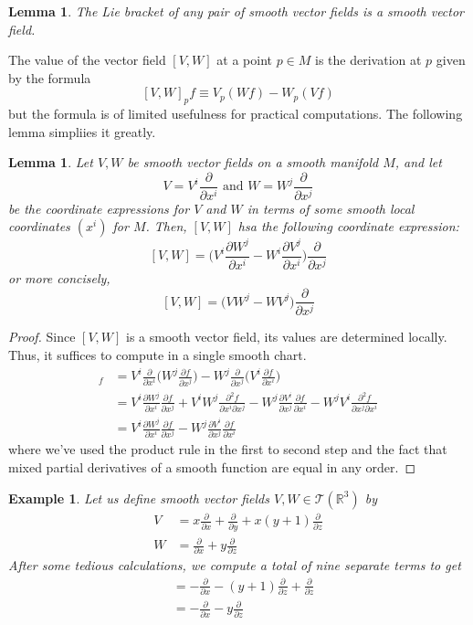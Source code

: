 \documentclass{article}
\newtheorem{lemma}[theorem]{Lemma}
\newtheorem{example}{Example}[section]
\theoremstyle{remark}
\theoremstyle{definition}
\begin{document}
\begin{lemma}
The Lie bracket of any pair of smooth vector fields is a smooth vector field.
\end{lemma}

The value of the vector field $[V, W]$ at a point $p \in M$ is the derivation at $p$ given by the formula
\[[V, W]_p f \equiv V_p (W f) - W_p (V f)\]
but the formula is of limited usefulness for practical computations. The following lemma simpliies it greatly. 

\begin{lemma}
Let $V, W$ be smooth vector fields on a smooth manifold $M$, and let
\[V = V^i \frac{\partial}{\partial x^i} \text{ and } W = W^j \frac{\partial}{\partial x^j}\]
be the coordinate expressions for $V$ and $W$ in terms of some smooth local coordinates $(x^i)$ for $M$. Then, $[V, W]$ hsa the following coordinate expression: 
\[[V, W] = \bigg( V^i \frac{\partial W^j}{\partial x^i} - W^i \frac{\partial V^j}{\partial x^i}\bigg) \frac{\partial}{\partial x^j}\]
or more concisely, 
\[[V, W] = \big(V W^j - W V^j \big) \frac{\partial}{\partial x^j}\]
\end{lemma}
\begin{proof}
Since $[V, W]$ is a smooth vector field, its values are determined locally. Thus, it suffices to compute in a single smooth chart. 
\begin{align*}
    [V,W]_f & = V^i \frac{\partial}{\partial x^i} \bigg( W^j \frac{\partial f}{\partial x^j} \bigg) - W^j \frac{\partial}{\partial x^j} \bigg( V^i \frac{\partial f}{\partial x^i} \bigg) \\
    & = V^i \frac{\partial W^j}{\partial x^i} \frac{\partial f}{\partial x^j} + V^i W^j \frac{\partial^2 f}{\partial x^i \partial x^j} - W^j \frac{\partial V^i}{\partial x^j} \frac{\partial f}{\partial x^i} - W^j V^i \frac{\partial^2 f}{\partial x^j \partial x^i} \\
    & = V^i \frac{\partial W^j}{\partial x^i} \frac{\partial f}{\partial x^j} - W^j \frac{\partial V^i}{\partial x^j} \frac{\partial f}{\partial x^i}
\end{align*}
where we've used the product rule in the first to second step and the fact that mixed partial derivatives of a smooth function are equal in any order. 
\end{proof}

\begin{example}
Let us define smooth vector fields $V, W \in \mathcal{T}(\mathbb{R}^3)$ by 
\begin{align*}
    V & = x \frac{\partial}{\partial x} + \frac{\partial}{\partial y} + x (y+1) \frac{\partial}{\partial z} \\
    W & = \frac{\partial}{\partial x} + y \frac{\partial}{\partial z}
\end{align*}
After some tedious calculations, we compute a total of nine separate terms to get 
\begin{align*}
    [V, W] & = - \frac{\partial}{\partial x} - (y+1) \frac{\partial}{\partial z} + \frac{\partial}{\partial z} \\
    & = - \frac{\partial}{\partial x} - y \frac{\partial}{\partial z} 
\end{align*}
\end{example}
\end{document}
